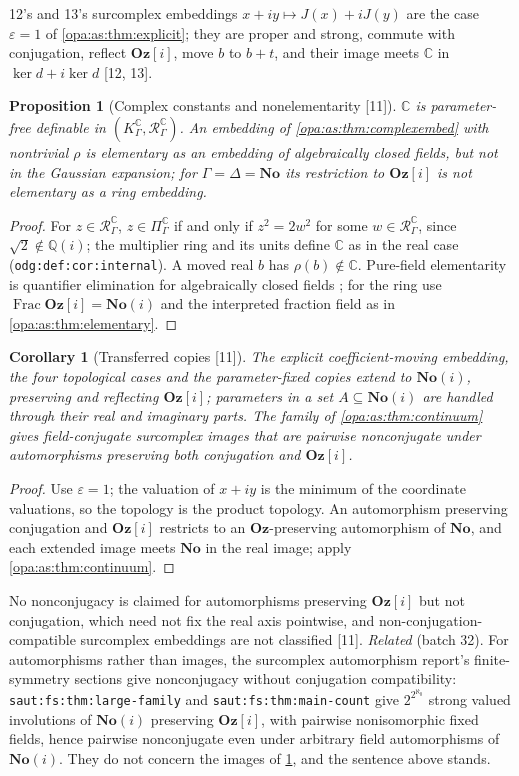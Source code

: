 \documentclass[11pt,oneside]{article}
\numberwithin{equation}{section}
\newtheorem{proposition}[proposition]{Proposition}
\newtheorem{corollary}[corollary]{Corollary}
\theoremstyle{definition}
\theoremstyle{remark}
\newcommand{\No}{\mathbf{No}}
\newcommand{\Oz}{\mathbf{Oz}}
\newcommand{\Og}{\mathbf{Oz}[i]}
\newcommand{\SC}{\mathbf{No}(i)}
\newcommand{\C}{\mathbb C}
\newcommand{\Q}{\mathbb Q}
\newcommand{\Frac}{\operatorname{Frac}}
\newcommand{\src}[1]{\textup{\textsf{\small[#1]}}}
\newcommand{\lbl}[1]{\nolinkurl{#1}}
\begin{document}
12's and 13's surcomplex embeddings $x+iy\mapsto J(x)+iJ(y)$ are the case $\varepsilon=1$ of
\cref{opa:as:thm:explicit}; they are proper and strong, commute with conjugation, reflect $\Og$, move $b$ to $b+t$,
and their image meets $\C$ in $\ker d+i\ker d$ \src{12, 13}.

\begin{proposition}[Complex constants and nonelementarity \src{11}]\label{opa:as:prop:complexconst}
$\C$ is parameter-free definable in $(K^\C_\Gamma,\mathcal R^\C_\Gamma)$. An embedding of
\cref{opa:as:thm:complexembed} with nontrivial $\rho$ is elementary as an embedding of algebraically closed fields,
but not in the Gaussian expansion; for $\Gamma=\Delta=\No$ its restriction to $\Og$ is not elementary as a ring
embedding.
\end{proposition}
\begin{proof}
For $z\in\mathcal R^\C_\Gamma$, $z\in\Pi^\C_\Gamma$ if and only if $z^2=2w^2$ for some $w\in\mathcal R^\C_\Gamma$, since
$\sqrt2\notin\Q(i)$; the multiplier ring and its units define $\C$ as in the real case (\lbl{odg:def:cor:internal}). A
moved real $b$ has $\rho(b)\notin\C$. Pure-field elementarity is quantifier elimination for algebraically closed fields
\cite{Marker}; for the ring use $\Frac\Og=\SC$ and the interpreted fraction field as in \cref{opa:as:thm:elementary}.
\end{proof}

\begin{corollary}[Transferred copies \src{11}]\label{opa:as:cor:complexcopies}
The explicit coefficient-moving embedding, the four topological cases and the parameter-fixed copies extend to $\SC$,
preserving and reflecting $\Og$; parameters in a set $A\subseteq\SC$ are handled through their real and imaginary parts.
The family of \cref{opa:as:thm:continuum} gives field-conjugate surcomplex images that are pairwise nonconjugate under
automorphisms preserving \emph{both} conjugation and $\Og$.
\end{corollary}
\begin{proof}
Use $\varepsilon=1$; the valuation of $x+iy$ is the minimum of the coordinate valuations, so the topology is the
product topology. An automorphism preserving conjugation and $\Og$ restricts to an $\Oz$-preserving automorphism of
$\No$, and each extended image meets $\No$ in the real image; apply \cref{opa:as:thm:continuum}.
\end{proof}

No nonconjugacy is claimed for automorphisms preserving $\Og$ but not conjugation, which need not fix the real axis
pointwise, and non-conjugation-compatible surcomplex embeddings are not classified \src{11}.
\emph{Related} (batch 32). For automorphisms rather than images, the surcomplex automorphism report's
finite-symmetry sections give nonconjugacy without conjugation compatibility: \lbl{saut:fs:thm:large-family} and
\lbl{saut:fs:thm:main-count} give $2^{2^{\aleph_0}}$ strong valued involutions of $\SC$ preserving $\Og$, with pairwise
nonisomorphic fixed fields, hence pairwise nonconjugate even under arbitrary field automorphisms of $\SC$. They do not
concern the images of \cref{opa:as:cor:complexcopies}, and the sentence above stands.
\end{document}
